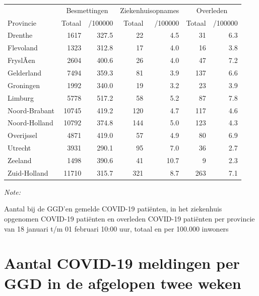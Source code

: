 \documentclass[
  english,
  man,floatsintext]{apa6}
\begin{document}
\begin{table}[H]
\centering
\begin{threeparttable}
\begin{tabular}{lrrrrrr}
\toprule
\multicolumn{1}{c}{ } & \multicolumn{2}{c}{Besmettingen} & \multicolumn{2}{c}{Ziekenhuisopnames} & \multicolumn{2}{c}{Overleden} \\
\cmidrule(l{3pt}r{3pt}){2-3} \cmidrule(l{3pt}r{3pt}){4-5} \cmidrule(l{3pt}r{3pt}){6-7}
Provincie & Totaal & /100000 & Totaal & /100000 & Totaal & /100000\\
\midrule
Drenthe & 1617 & 327.5 & 22 & 4.5 & 31 & 6.3\\
Flevoland & 1323 & 312.8 & 17 & 4.0 & 16 & 3.8\\
FryslÃ¢n & 2604 & 400.6 & 26 & 4.0 & 47 & 7.2\\
Gelderland & 7494 & 359.3 & 81 & 3.9 & 137 & 6.6\\
Groningen & 1992 & 340.0 & 19 & 3.2 & 23 & 3.9\\
Limburg & 5778 & 517.2 & 58 & 5.2 & 87 & 7.8\\
Noord-Brabant & 10745 & 419.2 & 120 & 4.7 & 117 & 4.6\\
Noord-Holland & 10792 & 374.8 & 144 & 5.0 & 123 & 4.3\\
Overijssel & 4871 & 419.0 & 57 & 4.9 & 80 & 6.9\\
Utrecht & 3931 & 290.1 & 95 & 7.0 & 36 & 2.7\\
Zeeland & 1498 & 390.6 & 41 & 10.7 & 9 & 2.3\\
Zuid-Holland & 11710 & 315.7 & 321 & 8.7 & 263 & 7.1\\
\bottomrule
\end{tabular}
\begin{tablenotes}
\item \textit{Note: } 
\item Aantal bij de GGD’en gemelde COVID-19 patiënten, in het ziekenhuis opgenomen COVID-19 patiënten en overleden COVID-19 patiënten per provincie van 18 januari t/m 01 februari 10:00 uur, totaal en per 100.000 inwoners
\end{tablenotes}
\end{threeparttable}
\end{table}

\newpage

\hypertarget{aantal-covid-19-meldingen-per-ggd-in-de-afgelopen-twee-weken}{%
\section{Aantal COVID-19 meldingen per GGD in de afgelopen twee weken}\label{aantal-covid-19-meldingen-per-ggd-in-de-afgelopen-twee-weken}}
\end{document}
